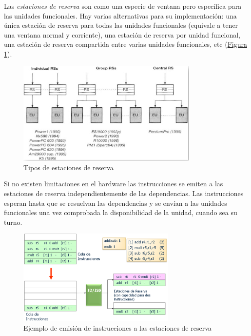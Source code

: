 \documentclass[10pt,a4paper,spanish]{report}
\begin{document}
Las \textcolor{azul}{\textit{estaciones de reserva}} son como una especie de ventana pero específica para las unidades funcionales. Hay varias alternativas para su implementación: una única estación de reserva para todas las unidades funcionales (equivale a tener una ventana normal y corriente), una estación de reserva por unidad funcional, una estación de reserva compartida entre varias unidades funcionales, etc (\hyperref[tipos_estaciones]{Figura \ref*{tipos_estaciones}}).

\begin{figure}[!h]
\centering
\includegraphics[width=0.8\textwidth]{91}
\caption{Tipos de estaciones de reserva}
\label{tipos_estaciones}
\end{figure}

Si no existen limitaciones en el hardware las instrucciones se emiten a las estaciones de reserva independientemente de las dependencias. Las instrucciones esperan hasta que se resuelvan las dependencias y se envían a las unidades funcionales una vez comprobada la disponibilidad de la unidad, cuando sea su turno.


\begin{figure}[!h]
\centering
\includegraphics[width=0.7\textwidth]{92}
\caption{Ejemplo  de emisión de instrucciones a las estaciones de reserva}
\label{emision_ej}
\end{figure}
\end{document}
